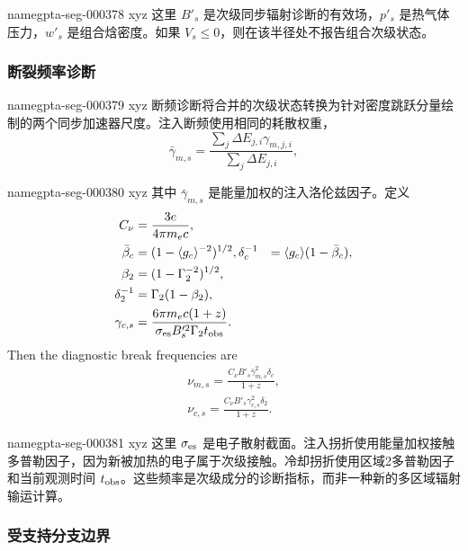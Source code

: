 \documentclass[twocolumn]{aastex702}
\makeatletter
\providecommand{\gptareaderanchor}[1]{\pdfdest name{#1} xyz}%
\providecommand{\gptareaderanchor}[1]{\special{pdf:dest (#1) [ @thispage /XYZ @xpos @ypos null ]}}%
\makeatother
\begin{document}
\gptareaderanchor{gpta-seg-000378}%
这里 \(B'_s\) 是次级同步辐射诊断的有效场，\(p'_s\) 是热气体压力，\(w'_s\) 是组合焓密度。如果 \(V_s\le0\)，则在该半径处不报告组合次级状态。

\subsubsection{断裂频率诊断}


\gptareaderanchor{gpta-seg-000379}%
断频诊断将合并的次级状态转换为针对密度跳跃分量绘制的两个同步加速器尺度。注入断频使用相同的耗散权重，
\begin{equation}
\bar{\gamma}_{m,s}=
\frac{\sum_j \Delta E_{j,i}\gamma_{m,j,i}}
{\sum_j \Delta E_{j,i}},
\end{equation}

\gptareaderanchor{gpta-seg-000380}%
其中 \(\bar{\gamma}_{m,s}\) 是能量加权的注入洛伦兹因子。定义
\begin{equation}
\begin{aligned}
C_\nu&=\frac{3e}{4\pi m_ec},\\
\bar\beta_c&=(1-\langle g_c\rangle^{-2})^{1/2},
\delta_c^{-1}&=\langle g_c\rangle(1-\bar\beta_c),\\
\beta_2&=(1-\Gamma_2^{-2})^{1/2},\\
\delta_2^{-1}&=\Gamma_2(1-\beta_2),\\
\gamma_{c,s}&=
\frac{6\pi m_ec(1+z)}
{\sigma_{\rm es} B_s^{\prime 2}\Gamma_2 t_{\rm obs}}.
\end{aligned}
\end{equation}
Then the diagnostic break frequencies are
\begin{equation}
\begin{aligned}
\nu_{m,s}=
\frac{C_\nu B'_s\bar{\gamma}_{m,s}^2\delta_c}{1+z},\\
\nu_{c,s}=
\frac{C_\nu B'_s\gamma_{c,s}^2\delta_2}{1+z}.
\end{aligned}
\end{equation}

\gptareaderanchor{gpta-seg-000381}%
这里 \(\sigma_{\rm es}\) 是电子散射截面。注入拐折使用能量加权接触多普勒因子，因为新被加热的电子属于次级接触。冷却拐折使用区域2多普勒因子和当前观测时间 \(t_{\rm obs}\)。这些频率是次级成分的诊断指标，而非一种新的多区域辐射输运计算。

\subsubsection{受支持分支边界}
\end{document}
